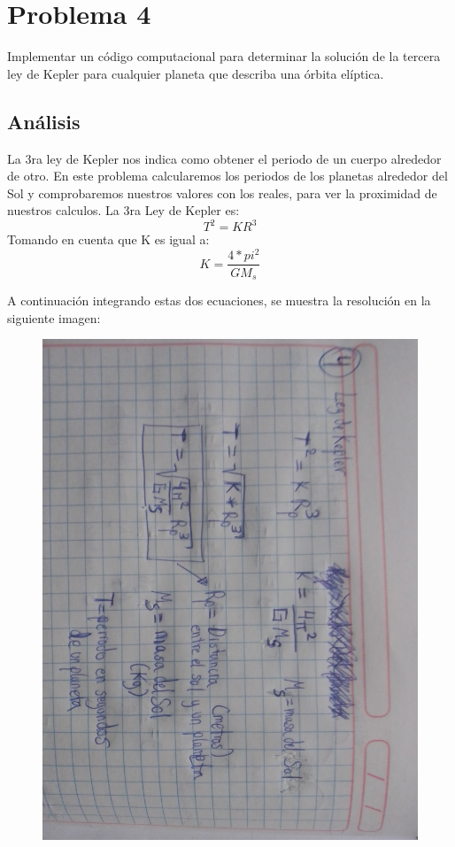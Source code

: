 \documentclass[a4paper,12pt]{article}
\begin{document}
    \section{Problema 4}
    Implementar un código computacional para 
    determinar la solución de la tercera ley de 
    Kepler para cualquier planeta que describa una órbita elíptica.
    
    \subsection{Análisis}
    La 3ra ley de Kepler nos indica como obtener el periodo de un cuerpo alrededor de otro.
    En este problema calcularemos los periodos de los planetas alrededor del Sol y comprobaremos
    nuestros valores con los reales, para ver la proximidad de nuestros calculos.
    La 3ra Ley de Kepler es:
    \begin{equation}
        T^2 = KR^3
    \end{equation}    
    Tomando en cuenta que K es igual a:
    \begin{equation}
        K = \frac{4*pi^2}{GM_s}
    \end{equation}

    A continuación integrando estas dos ecuaciones, se muestra la resolución
    en la siguiente imagen:
    \begin{figure}[htbp]
        \centering
        \includegraphics[scale=0.17,angle=90]{ejer4fc}        
    \end{figure}
    \newpage
\end{document}

